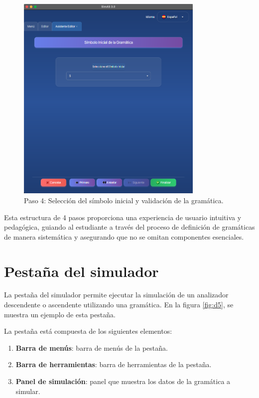 \needspace{6cm}
\begin{figure}[H]
\centering
\includegraphics[width=0.8\textwidth]{figuras2/editor/paso4_inicial.png}
\caption{Paso 4: Selección del símbolo inicial y validación de la gramática.}
\label{fig:paso4}
\end{figure}

Esta estructura de 4 pasos proporciona una experiencia de usuario intuitiva y pedagógica, guiando al estudiante a través del proceso de definición de gramáticas de manera sistemática y asegurando que no se omitan componentes esenciales.

\section{Pestaña del simulador}

La pestaña del simulador permite ejecutar la simulación de un analizador descendente o ascendente utilizando una gramática. En la figura \ref{fig:d5}, se muestra un ejemplo de esta pestaña.

La pestaña está compuesta de los siguientes elementos:
\begin{enumerate}
 \item \textbf{Barra de menús}: barra de menús de la pestaña.
 \item \textbf{Barra de herramientas}: barra de herramientas de la pestaña.
 \item \textbf{Panel de simulación}: panel que muestra los datos de la gramática a simular.
\end{enumerate}

